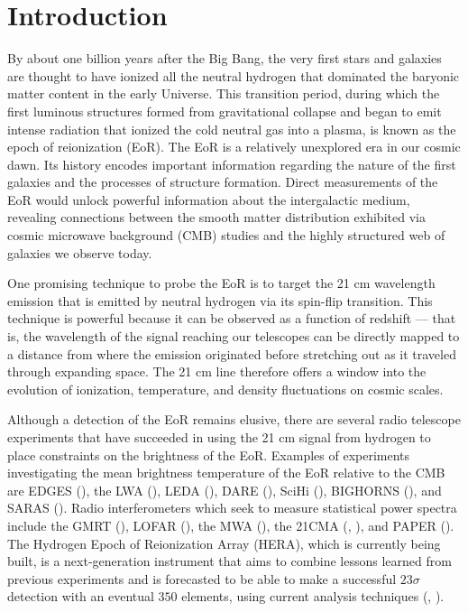 \documentclass[preprint2,numberedappendix,tighten,twocolappendix]{aastex6}  %
\begin{document}
\section{Introduction}
\label{sec:Intro}

By about one billion years after the Big Bang, the very first stars and galaxies are thought to have ionized all the neutral hydrogen that dominated the baryonic matter content in the early Universe. This transition period, during which the first luminous structures formed from gravitational collapse and began to emit intense radiation that ionized the cold neutral gas into a plasma, is known as the epoch of reionization (EoR). The EoR is a relatively unexplored era in our cosmic dawn. Its history encodes important information regarding the nature of the first galaxies and the processes of structure formation. Direct measurements of the EoR would unlock powerful information about the intergalactic medium, revealing connections between the smooth matter distribution exhibited via cosmic microwave background (CMB) studies and the highly structured web of galaxies we observe today.

One promising technique to probe the EoR is to target the 21 cm wavelength emission that is emitted by neutral hydrogen via its spin-flip transition. This technique is powerful because it can be observed as a function of redshift --- that is, the wavelength of the signal reaching our telescopes can be directly mapped to a distance from where the emission originated before stretching out as it traveled through expanding space. The 21 cm line therefore offers a window into the evolution of ionization, temperature, and density fluctuations on cosmic scales.

Although a detection of the EoR remains elusive, there are several radio telescope experiments that have succeeded in using the 21 cm signal from hydrogen to place constraints on the brightness of the EoR. Examples of experiments investigating the mean brightness temperature of the EoR relative to the CMB are EDGES (\citealt{bowman2010}), the LWA (\citealt{ellingson_et_al2009}), LEDA (\citealt{greenhill_bernardi2012}), DARE (\citealt{burns2012}), SciHi (\citealt{voytek2014}), BIGHORNS (\citealt{sokolowski2015}), and SARAS (\citealt{patra2015}). Radio interferometers which seek to measure statistical power spectra include the GMRT (\citealt{paciga_et_al2013}), LOFAR (\citealt{van_haarlem_et_al2013}), the MWA (\citealt{tingay_et_al2013}), the 21CMA (\citealt{peterson_et_al2004}, \citealt{wu2009}), and PAPER (\citealt{parsons_et_al2010}). The Hydrogen Epoch of Reionization Array (HERA), which is currently being built, is a next-generation instrument that aims to combine lessons learned from previous experiments and is forecasted to be able to make a successful $23\sigma$ detection with an eventual $350$ elements, using current analysis techniques (\citealt{deboer_et_al2017}, \citealt{pober_et_al2014}).
\end{document}
